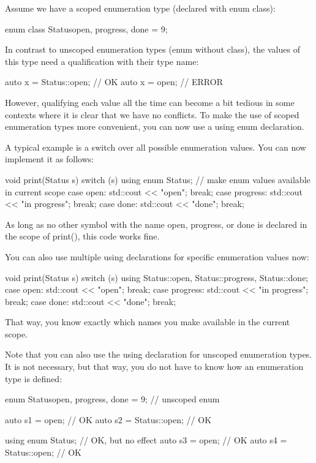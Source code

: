 

Assume we have a scoped enumeration type (declared with enum class):

\begin{cpp}
enum class Status{open, progress, done = 9};
\end{cpp}

In contrast to unscoped enumeration types (enum without class), the values of this type need a qualification with their type name:

\begin{cpp}
auto x = Status::open; // OK
auto x = open; // ERROR
\end{cpp}

However, qualifying each value all the time can become a bit tedious in some contexts where it is clear that we have no conflicts. To make the use of scoped enumeration types more convenient, you can now use a using enum declaration.

A typical example is a switch over all possible enumeration values. You can now implement it as follows:

\begin{cpp}
void print(Status s)
{
	switch (s) {
	using enum Status; // make enum values available in current scope
	case open:
		std::cout << "open";
		break;
	case progress:
		std::cout << "in progress";
		break;
	case done:
		std::cout << "done";
		break;
	}
}
\end{cpp}

As long as no other symbol with the name open, progress, or done is declared in the scope of print(), this code works fine.

You can also use multiple using declarations for specific enumeration values now:

\begin{cpp}
void print(Status s)
{
	switch (s) {
	using Status::open, Status::progress, Status::done;
	case open:
		std::cout << "open";
		break;
	case progress:
		std::cout << "in progress";
		break;
	case done:
		std::cout << "done";
		break;
	}
}
\end{cpp}

That way, you know exactly which names you make available in the current scope.

Note that you can also use the using declaration for unscoped enumeration types. It is not necessary, but that way, you do not have to know how an enumeration type is defined:

\begin{cpp}
enum Status{open, progress, done = 9}; // unscoped enum

auto s1 = open; // OK
auto s2 = Status::open; // OK

using enum Status; // OK, but no effect
auto s3 = open; // OK
auto s4 = Status::open; // OK
\end{cpp}





